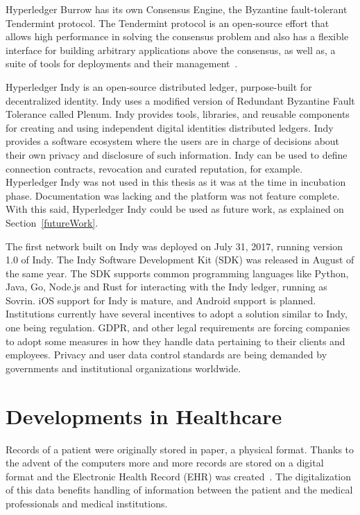 Hyperledger Burrow has its own Consensus Engine, the Byzantine fault-tolerant
Tendermint protocol.  The Tendermint protocol is an open-source effort that
allows high performance in solving the consensus problem and also has a
flexible interface for building arbitrary applications above the consensus, as
well as, a suite of tools for deployments and their
management~\cite{Buchman2016}.

Hyperledger Indy is an open-source distributed ledger, purpose-built for
decentralized identity. Indy uses a modified version of Redundant Byzantine
Fault Tolerance called Plenum. Indy provides tools, libraries, and reusable
components for creating and using independent digital identities distributed
ledgers. Indy provides a software ecosystem where the users are in charge of
decisions about their own privacy and disclosure of such information.  Indy can
be used to define connection contracts, revocation and curated reputation, for
example. Hyperledger Indy was not used in this thesis as it was at the time in
incubation phase. Documentation was lacking and the platform was not feature
complete. With this said, Hyperledger Indy could be used as future work, as
explained on Section~\ref{futureWork}.

The first network built on Indy was deployed on July 31, 2017, running version
1.0 of Indy. The Indy Software Development Kit (SDK) was released in August of
the same year. The SDK supports common programming languages like Python, Java,
Go, Node.js and Rust for interacting with the Indy ledger, running as Sovrin.
iOS support for Indy is mature, and Android support is planned. Institutions
currently have several incentives to adopt a solution similar to Indy, one
being regulation. GDPR, and other legal requirements are forcing companies to
adopt some measures in how they handle data pertaining to their clients and
employees. Privacy and user data control standards are being demanded by
governments and institutional organizations worldwide.

\section{Developments in Healthcare} \label{blockchainHealthcare}

Records of a patient were originally stored in paper, a physical format.
Thanks to the advent of the computers more and more records are stored on a
digital format and the Electronic Health Record (EHR) was
created~\cite{Marquez2017}. The digitalization of this data benefits handling
of information between the patient and the medical professionals and medical
institutions\cite{ONCoordinator2017}.

